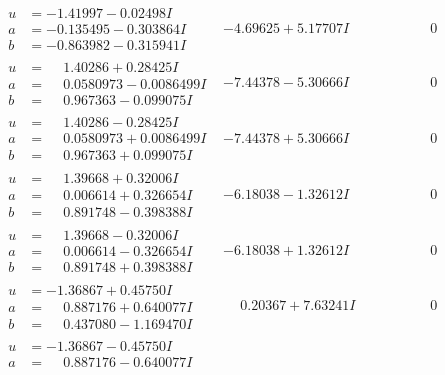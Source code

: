 \documentclass[1p]{elsarticle_modified}
\theoremstyle{definition}
\begin{document}
$$\begin{array}{c|c|c}
 \hline 
\begin{aligned}
u &= -1.41997 - 0.02498 I \\
a &= -0.135495 - 0.303864 I \\
b &= -0.863982 - 0.315941 I\end{aligned}
 & -4.69625 + 5.17707 I & \phantom{-0.000000 } 0 \\ \hline\begin{aligned}
u &= \phantom{-}1.40286 + 0.28425 I \\
a &= \phantom{-}0.0580973 - 0.0086499 I \\
b &= \phantom{-}0.967363 - 0.099075 I\end{aligned}
 & -7.44378 - 5.30666 I & \phantom{-0.000000 } 0 \\ \hline\begin{aligned}
u &= \phantom{-}1.40286 - 0.28425 I \\
a &= \phantom{-}0.0580973 + 0.0086499 I \\
b &= \phantom{-}0.967363 + 0.099075 I\end{aligned}
 & -7.44378 + 5.30666 I & \phantom{-0.000000 } 0 \\ \hline\begin{aligned}
u &= \phantom{-}1.39668 + 0.32006 I \\
a &= \phantom{-}0.006614 + 0.326654 I \\
b &= \phantom{-}0.891748 - 0.398388 I\end{aligned}
 & -6.18038 - 1.32612 I & \phantom{-0.000000 } 0 \\ \hline\begin{aligned}
u &= \phantom{-}1.39668 - 0.32006 I \\
a &= \phantom{-}0.006614 - 0.326654 I \\
b &= \phantom{-}0.891748 + 0.398388 I\end{aligned}
 & -6.18038 + 1.32612 I & \phantom{-0.000000 } 0 \\ \hline\begin{aligned}
u &= -1.36867 + 0.45750 I \\
a &= \phantom{-}0.887176 + 0.640077 I \\
b &= \phantom{-}0.437080 - 1.169470 I\end{aligned}
 & \phantom{-}0.20367 + 7.63241 I & \phantom{-0.000000 } 0 \\ \hline\begin{aligned}
u &= -1.36867 - 0.45750 I \\
a &= \phantom{-}0.887176 - 0.640077 I \\

\end{aligned}
\end{array}$$
\end{document}
